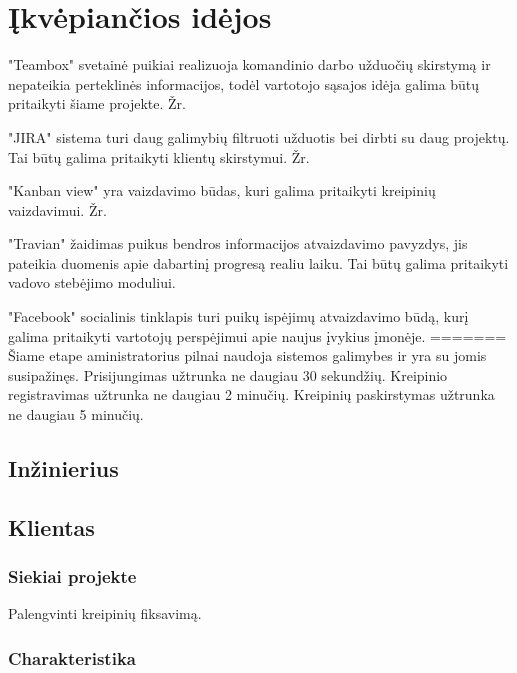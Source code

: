 \section{Įkvėpiančios idėjos}

"Teambox" svetainė puikiai realizuoja komandinio darbo užduočių skirstymą ir nepateikia perteklinės informacijos, todėl vartotojo sąsajos idėja galima būtų pritaikyti šiame projekte. Žr. 


"JIRA" sistema turi daug galimybių filtruoti užduotis bei dirbti su daug projektų. Tai būtų galima pritaikyti klientų skirstymui. Žr. 


"Kanban view" yra vaizdavimo būdas, kuri galima pritaikyti kreipinių vaizdavimui. Žr. 


"Travian" žaidimas puikus bendros informacijos atvaizdavimo pavyzdys, jis pateikia duomenis apie dabartinį progresą realiu laiku. Tai būtų galima pritaikyti vadovo stebėjimo moduliui.

"Facebook" socialinis tinklapis turi puikų ispėjimų atvaizdavimo būdą, kurį galima pritaikyti vartotojų perspėjimui apie naujus įvykius įmonėje.
=======
			Šiame etape aministratorius pilnai naudoja sistemos galimybes ir yra su jomis susipažinęs.
			Prisijungimas užtrunka ne daugiau 30 sekundžių. Kreipinio registravimas užtrunka ne daugiau 2 minučių.
			Kreipinių paskirstymas užtrunka ne daugiau 5 minučių.
			
	\subsection{Inžinierius}
	
	\subsection{Klientas}
			
		\subsubsection{Siekiai projekte}
		
		Palengvinti kreipinių fiksavimą.
		
		\subsubsection{Charakteristika}
		
